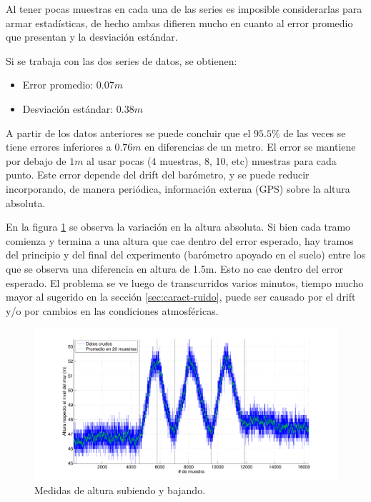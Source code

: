 \documentclass[main]{subfiles}
\begin{document}
Al tener pocas muestras en cada una de las series es imposible considerarlas para armar estadísticas, de hecho ambas difieren mucho en cuanto al error promedio que presentan y la desviación estándar. 

Si se trabaja con las dos series de datos, se obtienen:

\begin{itemize}
\item Error promedio: $0.07m$
\item Desviación estándar: $0.38m$
\end{itemize}

A partir de los datos anteriores se puede concluir que el $95.5 \%$ de las veces se tiene errores inferiores a $0.76m$ en diferencias de un metro. El error se mantiene por debajo de $1m$ al usar pocas (4 muestras, 8, 10, etc) muestras para cada punto. Este error depende del drift del barómetro, y se puede reducir incorporando, de manera periódica, información externa (GPS) sobre la altura absoluta.

En la figura \ref{fig:variando} se observa la variación en la altura absoluta. Si bien cada tramo comienza y termina a una altura que cae dentro del error esperado, hay tramos del principio y del final del experimento (barómetro apoyado en el suelo) entre los que se observa una diferencia en altura de 1.5m. Esto no cae dentro del error esperado. El problema se ve luego de transcurridos varios minutos, tiempo mucho mayor al sugerido en la sección \ref{sec:caract-ruido}, puede ser causado por el drift y/o por cambios en las condiciones atmosféricas.

\begin{figure}[H]
  \includegraphics[width=1\textwidth]{./pics_barom/variando.pdf}
  \caption{Medidas de altura subiendo y bajando.}
  \label{fig:variando}
\end{figure}
\end{document}
